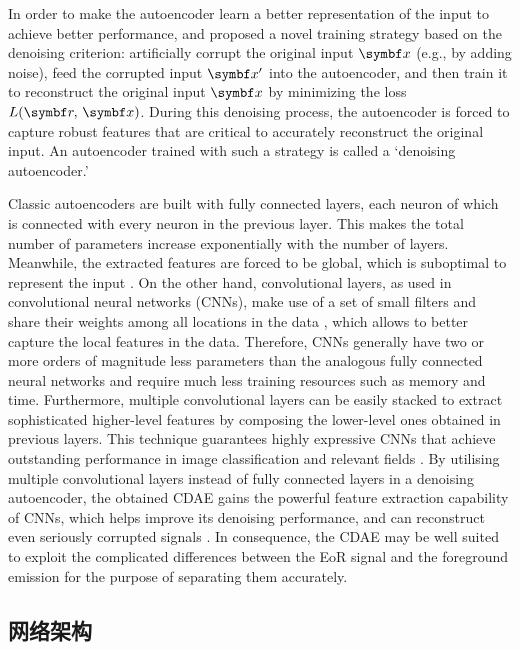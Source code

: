In order to make the autoencoder learn a better representation of the input
to achieve better performance, \citet{vincent2008} and \citet{vincent2010} proposed a
novel training strategy based on the denoising criterion:
artificially corrupt the original input $\B{x}$ (e.g., by adding noise),
feed the corrupted input $\B{x}'$ into the autoencoder, and then train it
to reconstruct the original input $\B{x}$ by minimizing the loss
$L(\B{r}, \,\B{x})$.
During this denoising process, the autoencoder is
forced to capture robust features that are critical to accurately
reconstruct the original input.
An autoencoder trained with such a strategy
is called a `denoising autoencoder.'

Classic autoencoders are built with fully connected layers, each neuron of
which is connected with every neuron in the previous layer.
This makes the total number of parameters increase exponentially with the
number of layers.
Meanwhile, the extracted features are forced to be global, which
is suboptimal to represent the input \cite{masci2011}.
On the other hand, convolutional layers, as used in convolutional neural
networks (CNNs),
make use of a set of small filters and share their weights among
all locations in the data \cite{lecun1998}, which allows to
better capture the local features in the data.
Therefore, CNNs generally have two or more orders of magnitude less
parameters than the analogous fully connected neural networks
\cite{grais2017}
and require much less training resources such as memory and time.
Furthermore, multiple convolutional layers can be easily stacked to extract
sophisticated higher-level features by composing the lower-level ones
obtained in previous layers.
This technique guarantees highly expressive CNNs that achieve
outstanding performance in image classification and relevant fields
\cite{krizhevsky2012,simonyan2014,szegedy2015,ma2019}.
By utilising multiple convolutional layers instead of fully connected
layers in a denoising autoencoder, the obtained CDAE gains the powerful
feature extraction capability of CNNs, which helps improve its denoising
performance, and can reconstruct even seriously corrupted signals
\cite{du2017}.
In consequence, the CDAE may be well suited to exploit the complicated
differences between the EoR signal and the foreground emission
for the purpose of separating them accurately.

\subsection{网络架构}
\label{sec:architecture}

